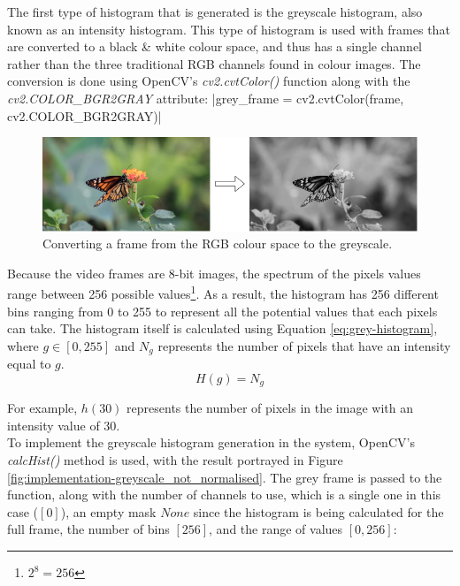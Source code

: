 The first type of histogram that is generated is the greyscale histogram, also known as an intensity histogram. This type of histogram is used with frames that are converted to a black \& white colour space, and thus has a single channel rather than the three traditional RGB channels found in colour images. The conversion is done using OpenCV's \textit{cv2.cvtColor()} function along with the \textit{cv2.COLOR\_BGR2GRAY} attribute: 
|grey_frame = cv2.cvtColor(frame, cv2.COLOR_BGR2GRAY)|

\begin{figure}[h] 
\centerline{\includegraphics[width=\textwidth]{figures/implementation/rgb_to_greyscale.png}}
\caption{\label{fig:rgb_to_greyscale}Converting a frame from the RGB colour space to the greyscale.}
\end{figure}

Because the video frames are 8-bit images, the spectrum of the pixels values range between 256 possible values\footnote{$2^8=256$}. As a result, the histogram has 256 different bins ranging from 0 to 255 to represent all the potential values that each pixels can take. The histogram itself is calculated using Equation \ref{eq:grey-histogram}, where $g\in [0, 255]$ and $N_g$ represents the number of pixels that have an intensity equal to $g$.
\begin{equation}
\label{eq:grey-histogram}
    H(g)=N_g
\end{equation}

For example, $h(30)$ represents the number of pixels in the image with an intensity value of 30.\\

To implement the greyscale histogram generation in the system, OpenCV's \textit{calcHist()} method is used, with the result portrayed in Figure \ref{fig:implementation-greyscale_not_normalised}. The grey frame is passed to the function, along with the number of channels to use, which is a single one in this case ($[0]$), an empty mask $None$ since the histogram is being calculated for the full frame, the number of bins $[256]$, and the range of values $[0, 256]$:

